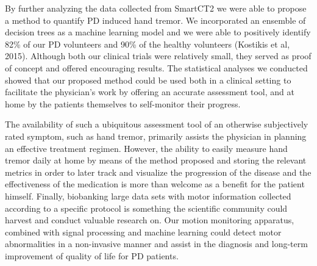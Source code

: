 By further analyzing the data collected from \gls{SmartCT2} we were able to propose a method to quantify \gls{PD} induced hand tremor. We incorporated an ensemble of decision trees as a machine learning model and we were able to positively identify 82\% of our \gls{PD} volunteers and 90\% of the healthy volunteers (Kostikis et al, 2015). Although both our clinical trials were relatively small, they served as proof of concept and offered encouraging results. The statistical analyses we conducted showed that our proposed method could be used both in a clinical setting to facilitate the physician's work by offering an accurate assessment tool, and at home by the patients themselves to self-monitor their progress. 

The availability of such a ubiquitous assessment tool of an otherwise subjectively rated symptom, such as hand tremor, primarily assists the physician in planning an effective treatment regimen. However, the ability to easily measure hand tremor daily at home by means of the method proposed and storing the relevant metrics in order to later track and visualize the progression of the disease and the effectiveness of the medication is more than welcome as a benefit for the patient himself. Finally, biobanking large data sets with motor information collected according to a specific protocol is something the scientific community could harvest and conduct valuable research on. Our motion monitoring apparatus, combined with signal processing and machine learning could detect motor abnormalities in a non-invasive manner and assist in the diagnosis and long-term improvement of quality of life for PD patients. 

